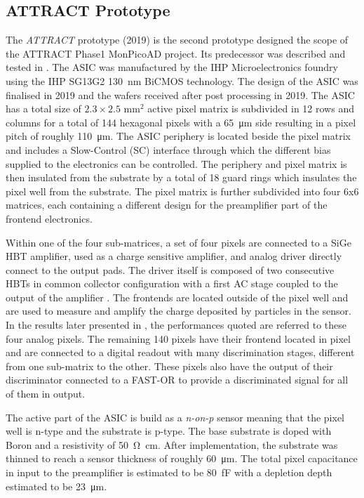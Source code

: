 		\subsection{ATTRACT Prototype}
		The \textit{ATTRACT} prototype (2019) is the second prototype designed the scope of the ATTRACT Phase1 MonPicoAD project. Its predecessor was described and tested in \cite{ATTRACT_proto1, ATTRACT_proto1_50ps}. The ASIC was manufactured by the IHP Microelectronics foundry using the IHP SG13G2 \SI{130}{\nano\meter} BiCMOS technology. The design of the ASIC was finalised in 2019 and the wafers received after post processing in 2019. The ASIC has a total size of $2.3 \times 2.5$ mm$^2$ active pixel matrix is subdivided in 12 rows and columns for a total of 144 hexagonal pixels with a \SI{65}{\micro\meter} side resulting in a pixel pitch of roughly \SI{110}{\micro\meter}. The ASIC periphery is located beside the pixel matrix and includes a Slow-Control (SC) interface through which the different bias supplied to the electronics can be controlled. The periphery and pixel matrix is then insulated from the substrate by a total of 18 guard rings which insulates the pixel well from the substrate. The pixel matrix is further subdivided into four 6x6 matrices, each containing a different design for the preamplifier part of the frontend electronics.  
			
		Within one of the four sub-matrices, a set of four pixels are connected to a SiGe HBT amplifier, used as a charge sensitive amplifier, and analog driver directly connect to the output pads. The driver itself is composed of two consecutive HBTs in common collector configuration with a first AC stage coupled to the output of the amplifier \cite{ATTRACT_proto1_testbeam}. The frontends are located outside of the pixel well and are used to measure and amplify the charge deposited by particles in the sensor. In the results later presented in , the performances quoted are referred to these four analog pixels. The remaining 140 pixels have their frontend located in pixel and are connected to a digital readout with many discrimination stages, different from one sub-matrix to the other. These pixels also have the output of their discriminator connected to a FAST-OR to provide a discriminated signal for all of them in output. 
		
		The active part of the ASIC is build as a \textit{n-on-p} sensor meaning that the pixel well is n-type and the substrate is p-type. The base substrate is doped with Boron and a resistivity of \SI{50}{\ohm \centi\meter}. After implementation, the substrate was thinned to reach a sensor thickness of roughly \SI{60}{\micro\meter}. The total pixel capacitance in input to the preamplifier is estimated to be \SI{80}{\femto\farad} with a depletion depth estimated to be \SI{23}{\micro\meter}. 
		
